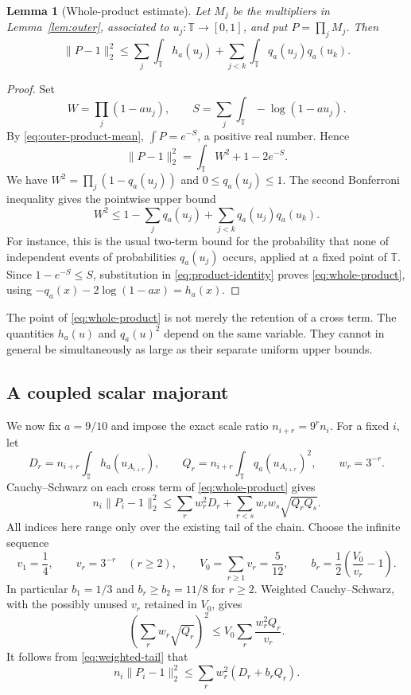 \documentclass[11pt,reqno]{amsart}
\numberwithin{equation}{section}
\newtheorem{lemma}[theorem]{Lemma}
\theoremstyle{definition}
\theoremstyle{remark}
\newcommand{\T}{\mathbb T}
\newcommand{\norm}[1]{\lVert#1\rVert}
\begin{document}
\begin{lemma}[Whole-product estimate]\label{lem:whole-product}
Let $M_j$ be the multipliers in Lemma~\ref{lem:outer}, associated to
$u_j:\T\to[0,1]$, and put $P=\prod_jM_j$. Then
\begin{equation}\label{eq:whole-product}
 \norm{P-1}_2^2
 \le\sum_j\int_\T h_a(u_j)
       +\sum_{j<k}\int_\T q_a(u_j)q_a(u_k).
\end{equation}
\end{lemma}
\begin{proof}
Set
\[
 W=\prod_j(1-au_j),\qquad
 S=\sum_j\int_\T-\log(1-au_j).
\]
By \eqref{eq:outer-product-mean}, $\int P=e^{-S}$, a positive real
number. Hence
\begin{equation}\label{eq:product-identity}
 \norm{P-1}_2^2=\int_\T W^2+1-2e^{-S}.
\end{equation}
We have $W^2=\prod_j(1-q_a(u_j))$ and $0\le q_a(u_j)\le1$. The second
Bonferroni inequality gives the pointwise upper bound
\[
 W^2\le1-\sum_jq_a(u_j)+\sum_{j<k}q_a(u_j)q_a(u_k).
\]
For instance, this is the usual two-term bound for the probability that
none of independent events of probabilities $q_a(u_j)$ occurs, applied
at a fixed point of $\T$. Since $1-e^{-S}\le S$, substitution in
\eqref{eq:product-identity} proves \eqref{eq:whole-product}, using
$-q_a(x)-2\log(1-ax)=h_a(x)$.
\end{proof}

The point of \eqref{eq:whole-product} is not merely the retention of a
cross term. The quantities $h_a(u)$ and $q_a(u)^2$ depend on the same
variable. They cannot in general be simultaneously as large as their
separate uniform upper bounds.

\subsection{A coupled scalar majorant}

We now fix $a=9/10$ and impose the exact scale ratio
$n_{i+r}=9^rn_i$. For a fixed $i$, let
\[
 D_r=n_{i+r}\int_\T h_a(u_{A_{i+r}}),\qquad
 Q_r=n_{i+r}\int_\T q_a(u_{A_{i+r}})^2,
 \qquad w_r=3^{-r}.
\]
Cauchy--Schwarz on each cross term of \eqref{eq:whole-product} gives
\begin{equation}\label{eq:weighted-tail}
 n_i\norm{P_i-1}_2^2
 \le\sum_rw_r^2D_r+\sum_{r<s}w_rw_s\sqrt{Q_rQ_s}.
\end{equation}
All indices here range only over the existing tail of the chain.
Choose the infinite sequence
\begin{equation}\label{eq:v-weights}
 v_1=\frac14,\qquad v_r=3^{-r}\quad(r\ge2),\qquad
 V_0=\sum_{r\ge1}v_r=\frac5{12},\qquad
 b_r=\frac12\left(\frac{V_0}{v_r}-1\right).
\end{equation}
In particular $b_1=1/3$ and $b_r\ge b_2=11/8$ for $r\ge2$.
Weighted Cauchy--Schwarz, with the possibly unused $v_r$ retained in
$V_0$, gives
\[
 \left(\sum_rw_r\sqrt{Q_r}\right)^2
 \le V_0\sum_r\frac{w_r^2Q_r}{v_r}.
\]
It follows from \eqref{eq:weighted-tail} that
\begin{equation}\label{eq:coupled-tail}
 n_i\norm{P_i-1}_2^2
 \le\sum_rw_r^2(D_r+b_rQ_r).
\end{equation}
\end{document}
